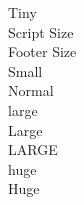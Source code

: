 \documentclass[12pt, times new roman]{article}
\begin{document}
\noindent \tiny{Tiny}\\
\scriptsize{Script Size}\\
\footnotesize{Footer Size}\\
\small{Small}\\
Normal\\
\large{large}\\
\Large{Large}\\
\LARGE{LARGE}\\
\huge{huge}\\
\Huge{Huge}\\
\end{document}
